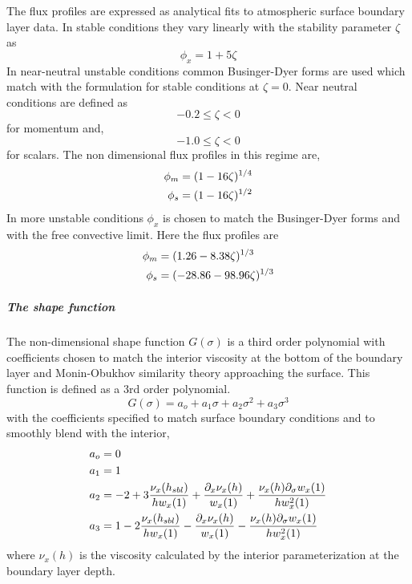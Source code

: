 The flux profiles are expressed as analytical fits to atmospheric
surface boundary layer data.  In stable conditions they vary linearly
with the stability parameter $\zeta$  as
\begin{equation}
\phi_x=1+5\zeta
\end{equation}
In near-neutral unstable conditions common Businger-Dyer forms are
used which match with the formulation for stable conditions at
$\zeta=0$.  Near neutral conditions are defined as 
\begin{equation}
-0.2 \leq \zeta < 0
\end{equation}
for momentum and,
\begin{equation}
-1.0 \leq \zeta < 0
\end{equation}
for scalars.  The non dimensional flux profiles in this regime are,
\begin{align}
\phi_m & =(1-16\zeta)^{1/4}
\\ \vspace{1mm}
\phi_s & =(1-16\zeta)^{1/2}
\end{align}
In more unstable conditions $\phi_x$ is chosen to match the
Businger-Dyer forms and with the free convective limit.  Here the flux 
profiles are 
\begin{align}
\phi_m & =(1.26-8.38\zeta)^{1/3}
\\ \vspace{1mm}
\phi_s & =(-28.86-98.96\zeta)^{1/3}
\end{align}

\subparagraph{The shape function}
The non-dimensional shape function $G(\sigma)$ is a third order
polynomial with coefficients chosen to match the interior viscosity at
the bottom of the boundary layer and Monin-Obukhov
similarity theory approaching the surface.  This function is defined
as a 3rd order polynomial.
\begin{equation}
G(\sigma)=a_o+a_1\sigma+a_2\sigma^2+a_3\sigma^3
\end{equation}
with the coefficients specified to match surface boundary conditions
and to smoothly blend with the interior,
\begin{align}
  a_o & =0
\\ \vspace{1mm}
  a_1 & =1
\\ \vspace{1mm}
  a_2 & =-2+3\frac{\nu_{x}(h_{sbl})}{hw_x(1)}+\frac{\partial_x
  \nu_{x}(h)}{w_{x}(1)}+\frac{\nu_{x}(h)
  \partial_{\sigma}w_x(1)}{hw_{x}^{2}(1)}
\\ \vspace{1mm}
  a_3 & =1-2\frac{\nu_{x}(h_{sbl})}{hw_x(1)}-\frac{\partial_x
  \nu_{x}(h)}{w_{x}(1)}-\frac{\nu_{x}(h)
  \partial_{\sigma}w_x(1)}{hw_{x}^{2}(1)}
\end{align}
where $\nu_{x}(h)$ is the viscosity calculated by the interior
parameterization at the boundary layer depth.

